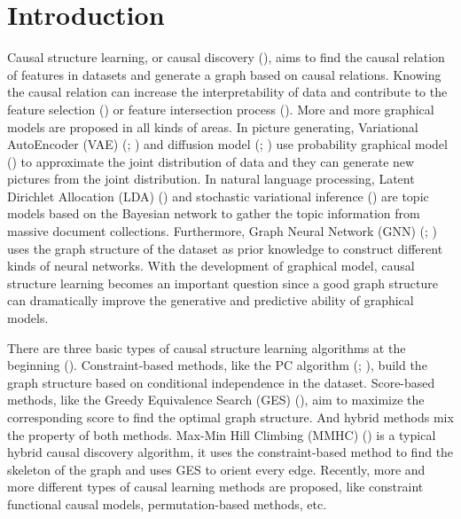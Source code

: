 \documentclass[twoside,11pt]{article}
\begin{document}
\section{Introduction}
Causal structure learning, or causal discovery (\cite{glymour2016causal}), aims to find the causal relation of features in datasets and generate a graph based on causal relations. Knowing the causal relation can increase the interpretability of data and contribute to the feature selection (\cite{li2017feature}) or feature intersection process (\cite{autocross}). More and more graphical models are proposed in all kinds of areas. In picture generating, Variational AutoEncoder (VAE) (\cite{kingma2013auto}; \cite{kingma2019introduction}) and diffusion model (\cite{sohl2015deep}; \cite{ho2020denoising}) use probability graphical model (\cite{koller2009probabilistic}) to approximate the joint distribution of data and they can generate new pictures from the joint distribution. In natural language processing, Latent Dirichlet Allocation (LDA) (\cite{blei2003latent}) and stochastic variational inference (\cite{hoffman2013stochastic}) are topic models based on the Bayesian network to gather the topic information from massive document collections. Furthermore, Graph Neural Network (GNN) (\cite{scarselli2008graph}; \cite{zhou2020graph}) uses the graph structure of the dataset as prior knowledge to construct different kinds of neural networks. With the development of graphical model, causal structure learning becomes an important question since a good graph structure can dramatically improve the generative and predictive ability of graphical models.

There are three basic types of causal structure learning algorithms at the beginning (\cite{scutari2018learns}). Constraint-based methods, like the PC algorithm (\cite{spirtes1999algorithm}; \cite{colombo2014order}), build the graph structure based on conditional independence in the dataset. Score-based methods, like the Greedy Equivalence Search (GES) (\cite{chickering2002optimal}), aim to maximize the corresponding score to find the optimal graph structure. And hybrid methods mix the property of both methods. Max-Min Hill Climbing (MMHC) (\cite{tsamardinos2006max}) is a typical hybrid causal discovery algorithm, it uses the constraint-based method to find the skeleton of the graph and uses GES to orient every edge. Recently, more and more different types of causal learning methods are proposed, like constraint functional causal models, permutation-based methods, etc. 
\end{document}
